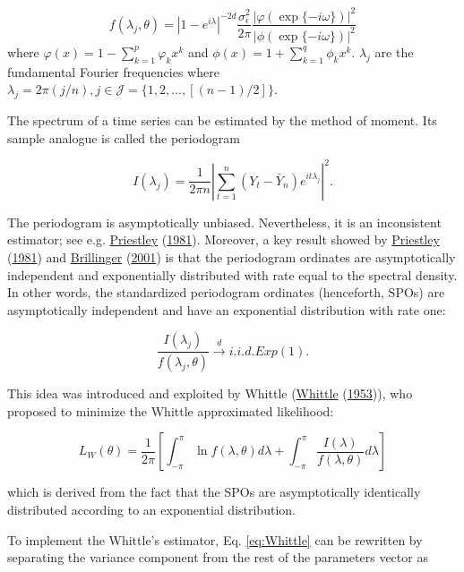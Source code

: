\documentclass[
  11pt,
]{article}
\begin{document}
\[
f(\lambda_j, \theta)=\left|1-e^{i \lambda}\right|^{-2 d}\frac{\sigma_{\epsilon}^{2}}{2 \pi} \frac{|\varphi(\exp \{-i \omega\})|^{2}}{|\phi(\exp \{-i \omega\})|^{2}}
\] where \(\varphi(x)=1-\sum_{k=1}^{p} \varphi_{k} x^{k}\) and
\(\phi(x)=1+\sum_{k=1}^{q} \phi_{k} x^{k}\). \(\lambda_j\) are the
fundamental Fourier frequencies where
\(\lambda_j=2 \pi(j / n), j \in \mathcal{J}=\{1,2, \ldots,[(n-1) / 2]\}\).

The spectrum of a time series can be estimated by the method of moment.
Its sample analogue is called the periodogram

\[I\left(\lambda_{j}\right)=\frac{1}{2 \pi n}\left|\sum_{t=1}^{n}\left(Y_{t}-\bar{Y}_{n}\right) e^{i t \lambda_{j}}\right|^{2}.\]

The periodogram is asymptotically unbiased. Nevertheless, it is an
inconsistent estimator; see e.g.
\protect\hyperlink{ref-priestley1981spectral}{Priestley}
(\protect\hyperlink{ref-priestley1981spectral}{1981}). Moreover, a key
result showed by
\protect\hyperlink{ref-priestley1981spectral}{Priestley}
(\protect\hyperlink{ref-priestley1981spectral}{1981}) and
\protect\hyperlink{ref-brillinger2001time}{Brillinger}
(\protect\hyperlink{ref-brillinger2001time}{2001}) is that the
periodogram ordinates are asymptotically independent and exponentially
distributed with rate equal to the spectral density. In other words, the
standardized periodogram ordinates (henceforth, SPOs) are asymptotically
independent and have an exponential distribution with rate one:

\[\frac{I(\lambda_j)}{f(\lambda_j, \theta)}  \stackrel{d}{\rightarrow} i . i . d . Exp(1).\]

This idea was introduced and exploited by Whittle
(\protect\hyperlink{ref-whittle1953estimation}{Whittle}
(\protect\hyperlink{ref-whittle1953estimation}{1953})), who proposed to
minimize the Whittle approximated likelihood:

\begin{equation}
L_{W}(\theta)=\frac{1}{2 \pi}\left[\int_{-\pi}^{\pi} \ln f(\lambda, \theta) d \lambda+\int_{-\pi}^{\pi} \frac{I(\lambda)}{f(\lambda, \theta)} d \lambda\right]
\label{eq:Whittle}
\end{equation}

which is derived from the fact that the SPOs are asymptotically
identically distributed according to an exponential distribution.

To implement the Whittle's estimator, Eq. \ref{eq:Whittle} can be
rewritten by separating the variance component from the rest of the
parameters vector as
\end{document}
